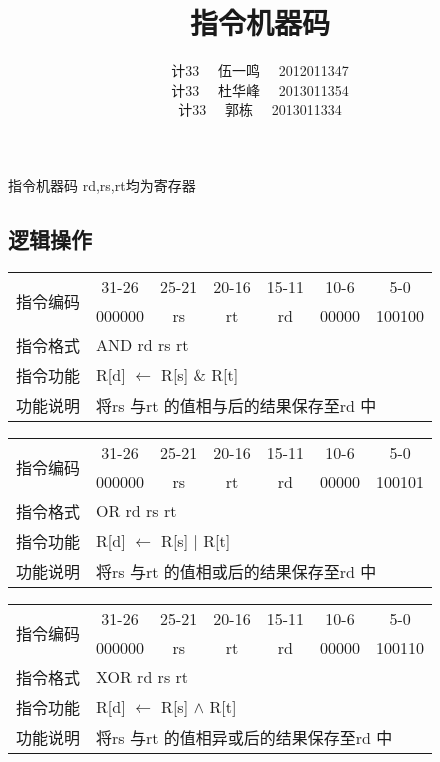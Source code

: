 \documentclass[a4paper,UTF8,fntef]{ctexart}
\makeatletter
\renewcommand{\section}{\@startsection{section}{1}{0mm}
  {1.5\baselineskip}{0.5\baselineskip}{\bf\leftline}}
\makeatother
\begin{document}
\title{\Large 指令机器码}
\author{计33~ ~伍一鸣~ ~2012011347\\计33~ ~杜华峰~ ~2013011354\\计33~ ~郭栋~ ~2013011334}
\maketitle
\tableofcontents
\newpage
\section{指令机器码}
rd,rs,rt均为寄存器
\subsection{逻辑操作}
	\begin{table}[!hbp]
		\centering
		\begin{tabular}{|c|c|c|c|c|c|c|}
		\hline
		\multirow{2}{*}{指令编码} & 31-26&25-21 & 20-16&15-11 &10-6 &5-0\\
		\cline{2-7} & 000000 & rs & rt & rd & 00000 & 100100 \\
		\hline
		指令格式&\multicolumn{6}{|l|}{AND rd rs rt}\\
		\hline		
		指令功能&\multicolumn{6}{|l|}{R[d] $\leftarrow$ R[s] \& R[t]}\\
		\hline		
		功能说明&\multicolumn{6}{|l|}{将rs 与rt 的值相与后的结果保存至rd 中}\\
		\hline
		\end{tabular}
	\end{table}
	\begin{table}[!hbp]
		\centering
		\begin{tabular}{|c|c|c|c|c|c|c|}
		\hline
		\multirow{2}{*}{指令编码} & 31-26&25-21 & 20-16&15-11 &10-6 &5-0\\
		\cline{2-7} & 000000 & rs & rt & rd & 00000 & 100101 \\
		\hline
		指令格式&\multicolumn{6}{|l|}{OR rd rs rt}\\
		\hline		
		指令功能&\multicolumn{6}{|l|}{R[d] $\leftarrow$ R[s] $|$ R[t]}\\
		\hline		
		功能说明&\multicolumn{6}{|l|}{将rs 与rt 的值相或后的结果保存至rd 中}\\
		\hline
		\end{tabular}
	\end{table}
	\begin{table}[!hbp]
		\centering
		\begin{tabular}{|c|c|c|c|c|c|c|}
		\hline
		\multirow{2}{*}{指令编码} & 31-26&25-21 & 20-16&15-11 &10-6 &5-0\\
		\cline{2-7} & 000000 & rs & rt & rd & 00000 & 100110 \\
		\hline
		指令格式&\multicolumn{6}{|l|}{XOR rd rs rt}\\
		\hline		
		指令功能&\multicolumn{6}{|l|}{R[d] $\leftarrow$ R[s] $\land$ R[t]}\\
		\hline		
		功能说明&\multicolumn{6}{|l|}{将rs 与rt 的值相异或后的结果保存至rd 中}\\
		\hline
		\end{tabular}
	\end{table}
\end{document}
